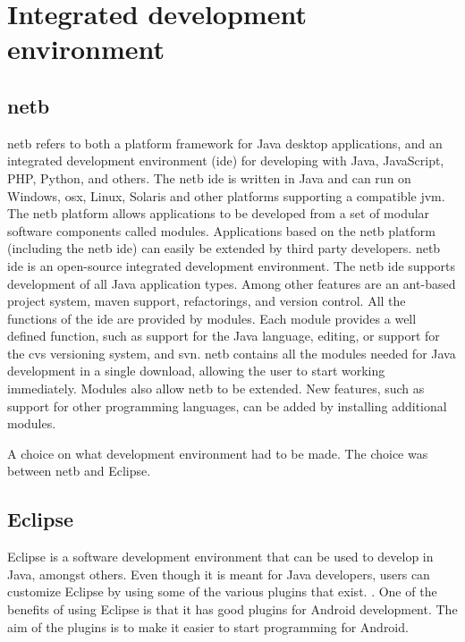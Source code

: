 \section{Integrated development environment}\label{sec:idedisc}

\subsection{\gls{netb}}
\gls{netb} refers to both a platform framework for Java desktop applications, and an integrated development environment (\gls{ide}) for developing with Java, JavaScript, PHP, Python, and others.
The \gls{netb} \gls{ide} is written in Java and can run on Windows, \gls{osx}, Linux, Solaris and other platforms supporting a compatible \gls{jvm}. 
\newline
\newline
The \gls{netb} platform allows applications to be developed from a set of modular software components called modules. Applications based on the \gls{netb} platform (including the \gls{netb} \gls{ide}) can easily be extended by third party developers. \cite{bib:netbeans}
\newline
\newline
\gls{netb} \gls{ide} is an open-source integrated development environment. The \gls{netb} \gls{ide} supports development of all Java application types. Among other features are an \gls{ant}-based project system, \gls{maven} support, refactorings, and version control. \cite{bib:ide}
\newline
\newline
All the functions of the \gls{ide} are provided by modules. Each module provides a well defined function, such as support for the Java language, editing, or support for the \gls{cvs} versioning system, and \gls{svn}. \gls{netb} contains all the modules needed for Java development in a single download, allowing the user to start working immediately. Modules also allow \gls{netb} to be extended. New features, such as support for other programming languages, can be added by installing additional modules.

A choice on what development environment had to be made. The choice was between \gls{netb} and Eclipse.

\subsection{Eclipse}
Eclipse is a software development environment that can be used to develop in Java, amongst others. Even though it is meant for Java developers, users can customize Eclipse by using some of the various plugins that exist. \cite{bib:eclipse}.
\newline
\newline
One of the benefits of using Eclipse is that it has good plugins for Android development. The aim of the plugins is to make it easier to start programming for Android.

